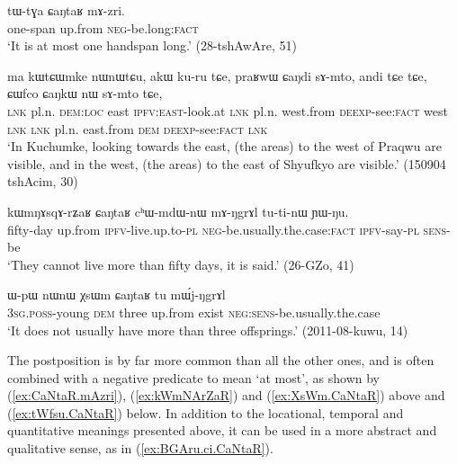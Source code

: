 \begin{exe}
\ex \label{ex:CaNtaR.mAzri}
 \gll  tɯ-tɣa ɕaŋtaʁ mɤ-zri. \\
 one-span up.from \textsc{neg}-be.long:\textsc{fact} \\
 \glt `It is at most one handspan long.' (28-tshAwAre, 51)
 \end{exe}
 
\begin{exe}
\ex \label{ex:praRwW.CaNdi}
 \gll ma kɯtɕɯmke nɯnɯtɕu, akɯ ku-ru tɕe, praʁwɯ ɕaŋdi sɤ-mto, 
andi tɕe tɕe, ɕɯfco ɕaŋkɯ nɯ sɤ-mto tɕe, \\
\textsc{lnk} pl.n. \textsc{dem}:\textsc{loc} east \textsc{ipfv}:\textsc{east}-look.at \textsc{lnk} pl.n. west.from \textsc{deexp}-see:\textsc{fact} west \textsc{lnk} \textsc{lnk} pl.n. east.from \textsc{dem} \textsc{deexp}-see:\textsc{fact} \textsc{lnk} \\
\glt `In Kuchumke, looking towards the east, (the areas) to the west of Praqwu are visible, and in the west, (the areas) to the east of Shyufkyo are visible.' (150904 tshAcim, 30)
\end{exe}

\begin{exe}
\ex \label{ex:kWmNArZaR}
 \gll kɯmŋɤsqɤ-rʑaʁ ɕaŋtaʁ cʰɯ-mdɯ-nɯ mɤ-ŋgrɤl tu-ti-nɯ ɲɯ-ŋu.  \\
 fifty-day up.from \textsc{ipfv}-live.up.to-\textsc{pl} \textsc{neg}-be.usually.the.case:\textsc{fact} \textsc{ipfv}-say-\textsc{pl} \textsc{sens}-be \\
\glt `They cannot live more than fifty days, it is said.' (26-GZo, 41)
\end{exe}

\begin{exe}
\ex \label{ex:XsWm.CaNtaR}
 \gll ɯ-pɯ nɯnɯ χsɯm ɕaŋtaʁ tu mɯ́j-ŋgrɤl \\
\textsc{3sg}.\textsc{poss}-young \textsc{dem} three up.from exist \textsc{neg}:\textsc{sens}-be.usually.the.case \\
\glt  `It does not usually have more than three offsprings.' (2011-08-kuwu, 14)
\end{exe}

The postposition   is by far more common than all the other ones, and is often combined with a negative predicate to mean `at most', as shown by (\ref{ex:CaNtaR.mAzri}), (\ref{ex:kWmNArZaR}) and (\ref{ex:XsWm.CaNtaR}) above and (\ref{ex:tWfsu.CaNtaR}) below. In addition to the locational, temporal and quantitative meanings presented above, it can be used in a more abstract and qualitative sense, as in (\ref{ex:BGAru.ci.CaNtaR}).

